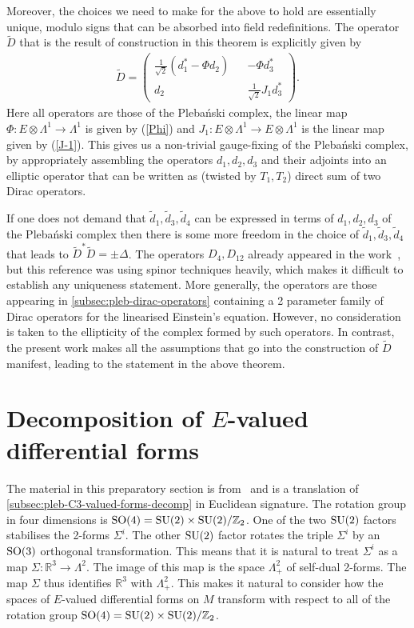 \documentclass[10pt]{report}
\newcommand{\pleb}[0]{Pleba\'nski}
\theoremstyle{definition}
\newcommand{\R}[0]{\mathbb{R}}
\newcommand{\Z}{{\mathbb{Z}}}
\begin{document}
Moreover, the choices we need to make for the above to hold are essentially unique, modulo signs that can be absorbed into field redefinitions. The operator $\tilde{D}$ that is the result of construction in this theorem is explicitly given by
\begin{align}
    \tilde{D} = \begin{pmatrix}\frac{1}{\sqrt{2}}(d^*_1 - \Phi d_2) && -\Phi d^*_3 \\ d_2 && \frac{1}{\sqrt{2}} J_1 d^*_3 \end{pmatrix}.
\end{align}
Here all operators are those of the \pleb{} complex, the linear map $\Phi: E\otimes \Lambda^1\to \Lambda^1$ is given by (\ref{Phi}) and $J_1: E\otimes \Lambda^1\to E\otimes \Lambda^1$ is the linear map given by (\ref{J-1}). This gives us a non-trivial gauge-fixing of the \pleb{} complex, by appropriately assembling the operators $d_1, d_2, d_3$ and their adjoints into an elliptic operator that can be written as (twisted by $T_1, T_2$) direct sum of two Dirac operators. 

If one does not demand that $\tilde{d}_1, \tilde{d}_3,\tilde{d}_4$ can be expressed in terms of $d_1, d_2, d_3$ of the \pleb{} complex then there is some more freedom in the choice of $\tilde{d}_1, \tilde{d}_3, \tilde{d}_4$ that leads to $\tilde{D}^* \tilde{D} =\pm \Delta$. The operators $D_4, D_{12}$ already appeared in the work~\cite{ChiralPerturbaKrasno2020}, but this reference was using spinor techniques heavily, which makes it difficult to establish any uniqueness statement. More generally, the operators are those appearing in \cref{subsec:pleb-dirac-operators} containing a 2 parameter family of Dirac operators for the linearised Einstein's equation. However, no consideration is taken to the ellipticity of the complex formed by such operators. In contrast, the present work makes all the assumptions that go into the construction of $\tilde{D}$ manifest, leading to the statement in the above theorem.


\section{Decomposition of \texorpdfstring{$E$}{E}-valued differential forms}\label{sec:decomp}

The material in this preparatory section is from~\cite{Su2StructureBhoja2024} and is a translation of \cref{subsec:pleb-C3-valued-forms-decomp} in Euclidean signature. The rotation group in four dimensions is ${\rm SO}(4)={\rm SU}(2)\times{\rm SU}(2)/\Z_2$. One of the two ${\rm SU}(2)$ factors stabilises the 2-forms $\Sigma^i$. The other ${\rm SU}(2)$ factor rotates the triple $\Sigma^i$ by an ${\rm SO}(3)$ orthogonal transformation. This means that it is natural to treat $\Sigma^i$ as a map $\Sigma: \R^3 \to \Lambda^2$. The image of this map is the space $\Lambda^2_+$ of self-dual 2-forms. The map $\Sigma$ thus identifies $\R^3$ with $\Lambda^2_+$. This makes it natural to consider how the spaces of $E$-valued differential forms on $M$ transform with respect to all of the rotation group ${\rm SO}(4)={\rm SU}(2)\times{\rm SU}(2)/\Z_2$. 
\end{document}
